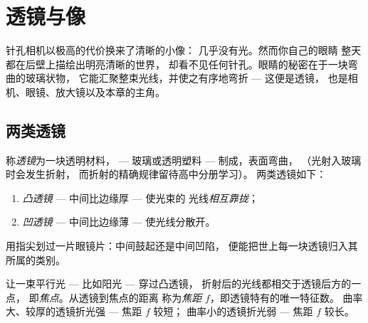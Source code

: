\chapter{透镜与像}\label{ch:g8:lenses-images}

针孔相机以极高的代价换来了清晰的小像：
几乎没有光。然而你自己的眼睛
整天都在后壁上描绘出明亮清晰的世界，
却看不见任何针孔。眼睛的秘密在于一块弯曲的玻璃状物，
它能汇聚整束光线，并使之有序地弯折 --- 这便是透镜，
也是相机、眼镜、放大镜以及本章的主角。

\section{两类透镜}

\begin{definition}[凸透镜与凹透镜]\label{def:g8:lenses-images:families}
称\emph{透镜}为一块透明材料，
--- 玻璃或透明塑料 --- 制成，表面弯曲，
（光射入玻璃时会发生折射，
而折射的精确规律留待高中分册学习）。
两类透镜如下：
\begin{enumerate}
  \item \emph{凸透镜} ---
        中间比边缘厚 --- 使光束的
        光线\emph{相互靠拢}；
  \item \emph{凹透镜} ---
        中间比边缘薄 --- 使光线分散开。
\end{enumerate}
用指尖划过一片眼镜片：中间鼓起还是中间凹陷，
便能把世上每一块透镜归入其所属的类别。
\end{definition}

\begin{definition}[焦点与焦距]\label{def:g8:lenses-images:focus}
让一束平行光 --- 比如阳光 --- 穿过凸透镜，
折射后的光线都相交于透镜后方的一点，
即\emph{焦点}。从透镜到焦点的距离
称为\emph{焦距}
$f$，即透镜特有的唯一特征数。
曲率大、较厚的透镜折光强 --- 焦距 $f$ 较短；
曲率小的透镜折光弱 --- 焦距 $f$ 较长。
\end{definition}

